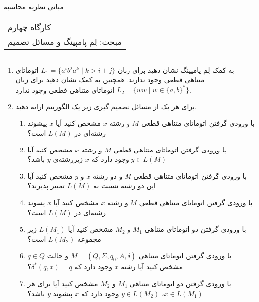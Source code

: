 \documentclass{article}
\newcommand*\circled[1]{
	\tikz[baseline=(char.base)]{
		\node[shape=circle,draw,inner sep=-1pt,color=red] (char) {\textcolor{black}{#1}\strut}
	}\kern-3pt
}
\renewcommand{\labelenumii}{\alph{enumii})}
\let\oldlabelenumii=\labelenumii
\newcommand{\StartCircledEnumii}{\renewcommand{\labelenumii}{\circled{\oldlabelenumii}}}
\newcommand{\EndCircledEnumii}{\renewcommand{\labelenumii}{\oldlabelenumii}}
\newcommand{\CircledEnumii}{\StartCircledEnumii\item\EndCircledEnumii}
\begin{document}
	\begin{center}
		\Huge
		مبانی نظریه محاسبه
	\end{center}
	\Large
	\begin{tabularx}{\linewidth}{>{\raggedleft\arraybackslash}X}
		کارگاه چهارم
		\\
		مبحث: لِم پامپینگ و مسائل تصمیم
		\\
		
	\end{tabularx}
	\rule{\textwidth}{1pt}
	\large
	\begin{enumerate}
		\item 
		به کمک لِم پامپینگ نشان دهید برای زبان $ L_1 = \{a^ib^ja^k \; | \; k >  i + j \} $ اتوماتای متناهی قطعی وجود ندارند. همچنین به کمک  نشان دهید برای زبان $ L_2 = \{ww \; | \;  w \in \{a,b\}^*\} $ اتوماتای متناهی قطعی وجود ندارد.
		
		\item 
	برای هر یک از مسائل تصمیم گیری زیر یک الگوریتم ارائه دهید. 
	\begin{enumerate}
		\item 
		با ورودی گرفتن اتوماتای متناهی قطعی $M$ و رشته $x$ مشخص کنید آیا $x$ پیشوند رشته‌ای در $ L(M) $ است؟
		\item
		با ورودی گرفتن اتوماتای متناهی قطعی $M$ و رشته $x$ مشخص کنید آیا $ y \in L(M) $ وجود دارد که $x$ زیررشته‌ی $y$ باشد؟
		\CircledEnumii
		با ورودی گرفتن اتوماتای متناهی قطعی $M$ و دو رشته $x$ و $y$ مشخص کنید آیا این دو رشته نسبت به $ L(M)‌ $ تمییز  پذیرند؟
		\CircledEnumii
		با ورودی گرفتن اتوماتای متناهی قطعی $M$ و رشته $x$ مشخص کنید آیا $ x $ پسوند رشته‌ای در $ L(M) $ است؟
		\CircledEnumii
		با ورودی گرفتن دو اتوماتای متناهی $ M_1 $ و $ M_2 $ مشخص کنید آیا $ L(M_1) $ زیر مجموعه $ L(M_2) $ است؟
		\CircledEnumii
		با ورودی گرفتن اتوماتای متناهی 
		$M = (Q, \Sigma, q_0, A, \delta)$
		 و حالت 
		 $q \in Q$
		 مشخص کنید آیا رشته $x$ وجود دارد که $\delta^*(q, x) = q$؟
		\CircledEnumii
		با ورودی گرفتن دو اتوماتای متناهی 
		$ M_1 $
		و
		$ M_2 $
		مشخص کنید آیا برای هر $x \in L(M_1)$، $y \in L(M_2)$ وجود دارد که $x$ پیشوند $y$ باشد؟
	\end{enumerate}
		

\end{enumerate}
\end{document}
